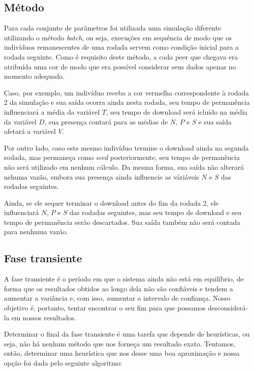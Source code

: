 \documentclass[a4paper,10pt]{article}
\begin{document}
\subsection{Método}

Para cada conjunto de parâmetros foi utilizada uma simulação diferente utilizando o método \textit{batch}, ou seja, execuções em sequência de modo que os indivíduos remanescentes de uma rodada servem como condição inicial para a rodada seguinte. Como é requisito deste método, a cada peer que chegava era atribuída uma cor de modo que era possível considerar seus dados apenas no momento adequado.

Caso, por exemplo, um indivíduo receba a cor vermelha correspondente à rodada 2 da simulação e sua saída ocorra ainda nesta rodada, seu tempo de permanência influenciará a média da variável $T$, seu tempo de download será icluído na média da variável $D$, sua presença contará para as médias de $N$, $P$ e $S$ e sua saída afetará a variável $V$.

Por outro lado, caso este mesmo indivíduo termine o download ainda na segunda rodada, mas permaneça como \textit{seed} posteriormente, seu tempo de permanência não será utilizado em nenhum cálculo. Da mesma forma, sua saída não alterará nehuma vazão, embora sua presença ainda influencie as váriáveis $N$ e $S$ das rodadas seguintes.

Ainda, se ele sequer terminar o download antes do fim da rodada 2, ele influenciará $N$, $P$ e $S$ das rodadas seguintes, mas seu tempo de download e seu tempo de permanência serão descartados. Sua saída também não será contada para nenhuma vazão.

\subsection{Fase transiente} %

A fase transiente é o período em que o sistema ainda não está em equilíbrio, de forma que os resultados obtidos ao longo dela não são confiáveis e tendem a aumentar a variância e, com isso, aumentar o intervalo de confiança. Nosso objetivo é, portanto, tentar encontrar o seu fim para que possamos desconsiderá-la em nossos resultados.

Determinar o final da fase transiente é uma tarefa que depende de heurísticas, ou seja, não há nenhum método que nos forneça um resultado exato. Tentamos, então, determinar uma heurística que nos desse uma boa aproximação e nossa opção foi dada pelo seguinte algoritmo:
\end{document}
